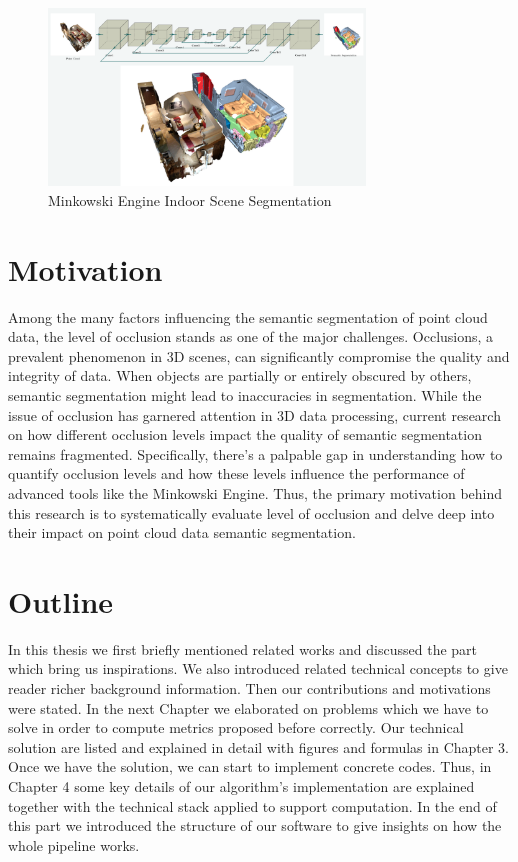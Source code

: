 \documentclass[11pt, a4paper,oneside,chapterprefix=false]{scrbook}
\begin{document}
\begin{figure}[h]
    \centering
    \includegraphics*[width=0.75\textwidth]{figures/Minkowski Engine.png}
    \caption{Minkowski Engine Indoor Scene Segmentation}
    \label{fig:minkowski}
\end{figure}


\section{Motivation} \label{sec:motivation}

Among the many factors influencing the semantic segmentation of point cloud data, the level of occlusion stands as one of the major challenges. Occlusions, a prevalent phenomenon in 3D scenes, can significantly compromise the quality and integrity of data. When objects are partially or entirely obscured by others, semantic segmentation might lead to inaccuracies in segmentation. While the issue of occlusion has garnered attention in 3D data processing, current research on how different occlusion levels impact the quality of semantic segmentation remains fragmented. Specifically, there's a palpable gap in understanding how to quantify occlusion levels and how these levels influence the performance of advanced tools like the Minkowski Engine. Thus, the primary motivation behind this research is to systematically evaluate level of occlusion and delve deep into their impact on point cloud data semantic segmentation.

\section{Outline} \label{sec:outline}

In this thesis we first briefly mentioned related works and discussed the part which bring us inspirations. We also introduced related technical concepts to give reader richer background information. Then our contributions and motivations were stated. In the next Chapter we elaborated on problems which we have to solve in order to compute metrics proposed before correctly. Our technical solution are listed and explained in detail with figures and formulas in Chapter 3. Once we have the solution, we can start to implement concrete codes. Thus, in Chapter 4 some key details of our algorithm's implementation are explained together with the technical stack applied to support computation. In the end of this part we introduced the structure of our software to give insights on how the whole pipeline works.
\end{document}
